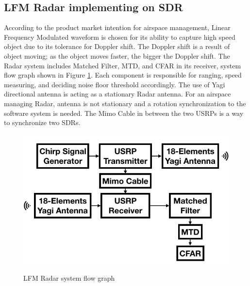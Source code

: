\documentclass[twocolumn]{IEEEtran} %
\begin{document}
\subsection{LFM Radar implementing on SDR}
According to the product market intention for airspace management, Linear Frequency Modulated waveform is chosen for its ability to capture high speed object due to its tolerance for Doppler shift. The Doppler shift is a result of object moving; as the object moves faster, the bigger the Doppler shift. The Radar system includes Matched Filter, MTD, and CFAR in its receiver, system flow graph shown in Figure \ref{fig:LFMcomp}. Each component is responsible for ranging, speed measuring, and deciding noise floor threshold accordingly. The use of Yagi directional antenna is acting as a stationary Radar antenna. For an airspace managing Radar, antenna is not stationary and a rotation synchronization to the software system is needed. The Mimo Cable in between the two USRPs is a way to synchronize two SDRs. \\
\begin{figure}[h]
{\includegraphics[width=\textwidth]{LFMcomp.png}}
\caption{LFM Radar system flow graph}
\label{fig:LFMcomp}
\end{figure}
\FloatBarrier
\end{document}
